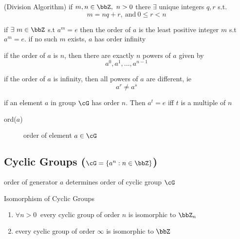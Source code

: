\documentclass[11pt, oneside, dvipdfmx]{book}
\begin{document}
	\begin{MyTheorem}
	(Division Algorithm)\newline
	if $m,n \in \bbZ,~n>0$ there $\exists$ unique integers $q,r$ s.t. $$m=nq+r,~\text{and} ~0 \leq r < n$$
	\end{MyTheorem}
	
	\begin{MyDefinition}{}
	if $\exists ~m \in \bbZ$ s.t $a^m=e$ then the order of $a$ is the least positive integer $m$ s.t $a^m=e$. if no such $m$ exists, $a$ has order infinity
	\end{MyDefinition}
	
	\begin{MyTheorem}
	if the order of $a$ is $n$, then there are exactly $n$ powers of $a$ given by
	$$ a^0,a^1,...,a^{n-1}$$
	\end{MyTheorem}
	
	\begin{MyTheorem}
	if the order of $a$ is infinity, then all powers of $a$ are different, ie
	$$ a^r \neq a^s$$
	\end{MyTheorem}
	
	
	\begin{MyTheorem}
	if an element $a$ in group $\cG$ has order $n$. Then $a^t=e$ iff $t$ is a multiple of $n$
	\end{MyTheorem}
	
	\begin{description}
	\item[ord($a$)] order of element $a \in \cG$
	\end{description}
	
	\subsection{Cyclic Groups ($\cG =\{ a^n : n\in \bbZ \}$)}
	order of generator $a$ determines order of cyclic group $\cG$
	
	\begin{MyTheorem}{Isomorphism of Cyclic Groups}
	\newline 
	\begin{enumerate}
	\item $\forall n >0~$ every cyclic group of order $n$ is isomorphic to $\bbZ_n$
	
	\item every cyclic group of order $\infty$ is isomorphic to $\bbZ$
	\end{enumerate}
	\end{MyTheorem}
	
\end{document}
